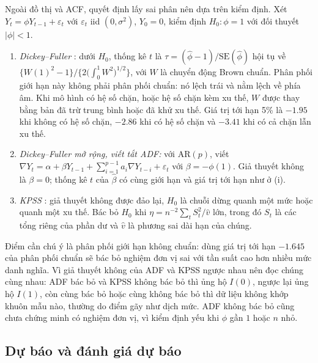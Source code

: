 Ngoài đồ thị và ACF, quyết định lấy sai phân nên dựa trên kiểm định. Xét $Y_t=\phi Y_{t-1}+\varepsilon_t$ với $\varepsilon_t$ iid $(0,\sigma^2)$, $Y_0=0$, kiểm định $H_0:\phi=1$ với đối thuyết $|\phi|<1$.
\begin{kq}
\begin{enumerate}[label=(\roman*),leftmargin=*,itemsep=1pt]
\item \emph{Dickey--Fuller} : dưới $H_0$, thống kê $t$ là $\tau=(\hat\phi-1)/\mathrm{SE}(\hat\phi)$ hội tụ về $\bigl\{W(1)^2-1\bigr\}\big/\bigl\{2\bigl(\int_0^1W^2\bigr)^{1/2}\bigr\}$, với $W$ là chuyển động Brown chuẩn. Phân phối giới hạn này không phải phân phối chuẩn: nó lệch trái và nằm lệch về phía âm. Khi mô hình có hệ số chặn, hoặc hệ số chặn kèm xu thế, $W$ được thay bằng bản đã trừ trung bình hoặc đã khử xu thế. Giá trị tới hạn 5\% là $-1.95$ khi không có hệ số chặn, $-2.86$ khi có hệ số chặn và $-3.41$ khi có cả chặn lẫn xu thế.
\item \emph{Dickey--Fuller mở rộng, viết tắt ADF:} với AR$(p)$, viết $\nabla Y_t=\alpha+\beta Y_{t-1}+\sum_{i=1}^{p-1}a_i\nabla Y_{t-i}+\varepsilon_t$ với $\beta=-\phi(1)$. Giả thuyết không là $\beta=0$; thống kê $t$ của $\hat\beta$ có cùng giới hạn và giá trị tới hạn như ở (i).
\item \emph{KPSS} : giả thuyết không được đảo lại, $H_0$ là chuỗi dừng quanh một mức hoặc quanh một xu thế. Bác bỏ $H_0$ khi $\eta=n^{-2}\sum_tS_t^2/\hat v$ lớn, trong đó $S_t$ là các tổng riêng của phần dư và $\hat v$ là phương sai dài hạn của chúng.
\end{enumerate}
\end{kq}
Điểm cần chú ý là phân phối giới hạn không chuẩn: dùng giá trị tới hạn $-1.645$ của phân phối chuẩn sẽ bác bỏ nghiệm đơn vị sai với tần suất cao hơn nhiều mức danh nghĩa. Vì giả thuyết không của ADF và KPSS ngược nhau nên đọc chúng cùng nhau: ADF bác bỏ và KPSS không bác bỏ thì ủng hộ $I(0)$, ngược lại ủng hộ $I(1)$, còn cùng bác bỏ hoặc cùng không bác bỏ thì dữ liệu không khớp khuôn mẫu nào, thường do điểm gãy như dịch mức. ADF không bác bỏ cũng chưa chứng minh có nghiệm đơn vị, vì kiểm định yếu khi $\phi$ gần $1$ hoặc $n$ nhỏ.


\subsection{Dự báo và đánh giá dự báo}

